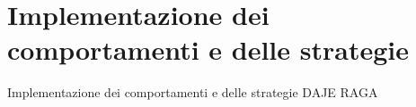 \section{Implementazione dei comportamenti e delle strategie}
\begin{frame}{Implementazione dei comportamenti e delle strategie}
	\centering
	DAJE RAGA
\end{frame}